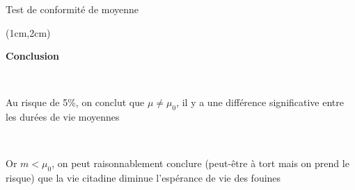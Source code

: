 \documentclass{beamer}
\begin{document}

\begin{frame}{Test  de conformité de moyenne}
\begin{textblock*}{\textwidth}(1cm,2cm)

\begin{center}{\bf \Large Conclusion  } \end{center}

\

Au risque de 5\%, on conclut que $\mu\neq\mu_0$, il y a une différence significative entre les durées de vie moyennes

\

Or $m<\mu_0$, on peut raisonnablement conclure
(peut-être à tort mais on prend le risque) que la vie citadine diminue l'espérance de vie des fouines

\end{textblock*}

\end{frame}

\end{document}

